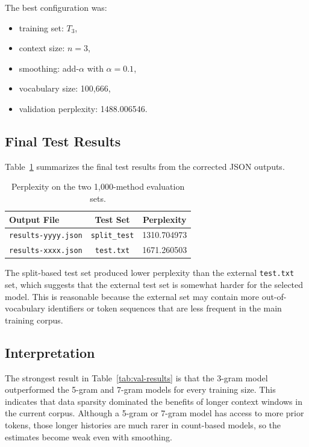 \documentclass[11pt]{article}
\begin{document}
The best configuration was:
\begin{itemize}[leftmargin=*]
  \item training set: \(T_3\),
  \item context size: \(n=3\),
  \item smoothing: add-\(\alpha\) with \(\alpha = 0.1\),
  \item vocabulary size: 100,666,
  \item validation perplexity: 1488.006546.
\end{itemize}

\subsection{Final Test Results}
Table~\ref{tab:test-results} summarizes the final test results from the corrected JSON outputs.

\begin{table}[H]
\centering
\begin{tabular}{lcc}
\toprule
Output File & Test Set & Perplexity \\
\midrule
\texttt{results-yyyy.json} & \texttt{split\_test} & 1310.704973 \\
\texttt{results-xxxx.json} & \texttt{test.txt} & 1671.260503 \\
\bottomrule
\end{tabular}
\caption{Perplexity on the two 1,000-method evaluation sets.}
\label{tab:test-results}
\end{table}

The split-based test set produced lower perplexity than the external \texttt{test.txt} set, which suggests that the external test set is somewhat harder for the selected model. This is reasonable because the external set may contain more out-of-vocabulary identifiers or token sequences that are less frequent in the main training corpus.

\subsection{Interpretation}
The strongest result in Table~\ref{tab:val-results} is that the 3-gram model outperformed the 5-gram and 7-gram models for every training size. This indicates that data sparsity dominated the benefits of longer context windows in the current corpus. Although a 5-gram or 7-gram model has access to more prior tokens, those longer histories are much rarer in count-based models, so the estimates become weak even with smoothing.
\end{document}
